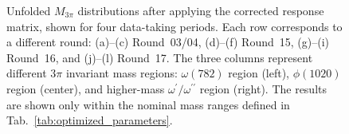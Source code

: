 \begin{figure}[htbp]
\caption{Unfolded $M_{3\pi}$ distributions after applying the corrected response matrix, shown for four data-taking periods. Each row corresponds to a different round: (a)--(c) Round~03/04, (d)--(f) Round~15, (g)--(i) Round~16, and (j)--(l) Round~17. The three columns represent different $3\pi$ invariant mass regions: $\omega(782)$ region (left), $\phi(1020)$ region (center), and higher-mass $\omega^{\prime}/\omega^{\prime\prime}$ region (right). The results are shown only within the nominal mass ranges defined in Tab.~\ref{tab:optimized_parameters}.}
\label{fig:unfolded_data_results_all_rounds}
\end{figure}